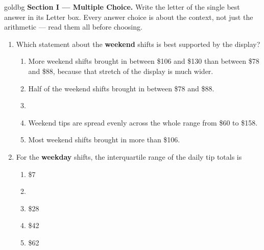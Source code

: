 \documentclass[12pt]{article}
\begin{document}
\vspace{0.14in}

\boxguard[16]
\begin{headlinebox}{goldbg}
\small
\textbf{Section I --- Multiple Choice.} Write the letter of the single best answer in its Letter box. Every answer choice is
about the context, not just the arithmetic --- read them all before choosing.
\end{headlinebox}

\vspace{0.10in}

\begin{enumerate}[leftmargin=1.9em, itemsep=0.13in]

  \item Which statement about the \textbf{weekend} shifts is best supported by the display?
        \begin{enumerate}[label=\textbf{(\Alph*)}, leftmargin=2.2em, itemsep=2pt]
          \item More weekend shifts brought in between \$106 and \$130 than between \$78 and
                \$88, because that stretch of the display is much wider.
          \item Half of the weekend shifts brought in between \$78 and \$88.
          \item {}
          \item Weekend tips are spread evenly across the whole range from \$60 to \$158.
          \item Most weekend shifts brought in more than \$106.
                \hfill{}
        \end{enumerate}

  \boxguard[9]
  \item For the \textbf{weekday} shifts, the interquartile range of the daily tip totals is
        \begin{enumerate}[label=\textbf{(\Alph*)}, leftmargin=2.2em, itemsep=2pt]
          \item \$7
          \item {}
          \item \$28
          \item \$42
          \item \$62
                \hfill{}
        \end{enumerate}


\end{enumerate}
\end{document}
